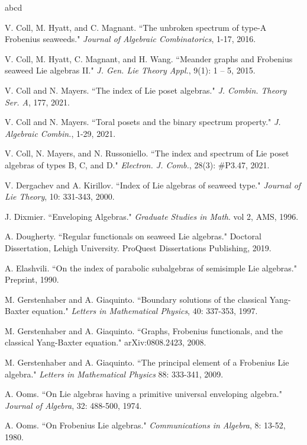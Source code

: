 \documentclass[letterpaper,10pt]{article}
\begin{document}
\begin{thebibliography}{abcd}

V. Coll, M. Hyatt, and C. Magnant. ``The unbroken spectrum of type-A Frobenius seaweeds." \textit{Journal of Algebraic Combinatorics}, 1-17, 2016. 

V. Coll, M. Hyatt, C. Magnant, and H. Wang. ``Meander graphs and Frobenius seaweed Lie algebras II." \textit{J. Gen. Lie Theory Appl.}, 9(1): 1 -- 5, 2015.

V. Coll and N. Mayers. ``The index of Lie poset algebras." \textit{J. Combin. Theory Ser. A}, 177, 2021.

V. Coll and N. Mayers. ``Toral posets and the binary spectrum property." \textit{J. Algebraic Combin.}, 1-29, 2021.


V. Coll, N. Mayers, and N. Russoniello. ``The index and spectrum of Lie poset algebras of types B, C, and D." \textit{Electron. J. Comb.}, 28(3): \#P3.47, 2021.

V. Dergachev and A. Kirillov. ``Index of Lie algebras of seaweed type." \textit{Journal of Lie Theory}, 10: 331-343, 2000.

J. Dixmier. ``Enveloping Algebras." \textit{Graduate Studies in Math}. vol 2, AMS, 1996.

A. Dougherty. ``Regular functionals on seaweed Lie algebras." Doctoral Dissertation, Lehigh University. ProQuest Dissertations Publishing, 2019.

A. Elashvili. ``On the index of parabolic subalgebras of semisimple Lie algebras." Preprint, 1990.

M. Gerstenhaber and A. Giaquinto. ``Boundary solutions of the classical Yang-Baxter equation." \textit{Letters in Mathematical Physics}, 40: 337-353, 1997.

M. Gerstenhaber and A. Giaquinto. ``Graphs, Frobenius functionals, and the classical Yang-Baxter equation." arXiv:0808.2423, 2008.

M. Gerstenhaber and A. Giaquinto. ``The principal element of a Frobenius Lie algebra." \textit{Letters in Mathematical Physics} 88: 333-341, 2009.

A. Ooms. ``On Lie algebras having a primitive universal enveloping algebra." \textit{Journal of Algebra}, 32: 488-500, 1974.

A. Ooms. ``On Frobenius Lie algebras." \textit{Communications in Algebra}, 8: 13-52, 1980.


\end{thebibliography}
\end{document}
